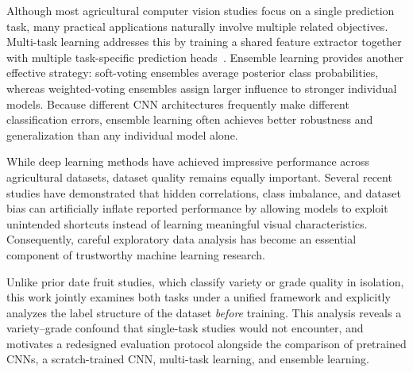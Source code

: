 \documentclass[conference]{IEEEtran}
\begin{document}
Although most agricultural computer vision studies focus on a single prediction task, many practical applications naturally involve multiple related objectives. Multi-task learning addresses this by training a shared feature extractor together with multiple task-specific prediction heads~\cite{caruana1997multitask}. Ensemble learning provides another effective strategy: soft-voting ensembles average posterior class probabilities, whereas weighted-voting ensembles assign larger influence to stronger individual models. Because different CNN architectures frequently make different classification errors, ensemble learning often achieves better robustness and generalization than any individual model alone.

While deep learning methods have achieved impressive performance across agricultural datasets, dataset quality remains equally important. Several recent studies have demonstrated that hidden correlations, class imbalance, and dataset bias can artificially inflate reported performance by allowing models to exploit unintended shortcuts instead of learning meaningful visual characteristics. Consequently, careful exploratory data analysis has become an essential component of trustworthy machine learning research.

Unlike prior date fruit studies, which classify variety or grade quality in isolation, this work jointly examines both tasks under a unified framework and explicitly analyzes the label structure of the dataset \emph{before} training. This analysis reveals a variety--grade confound that single-task studies would not encounter, and motivates a redesigned evaluation protocol alongside the comparison of pretrained CNNs, a scratch-trained CNN, multi-task learning, and ensemble learning.
\end{document}
